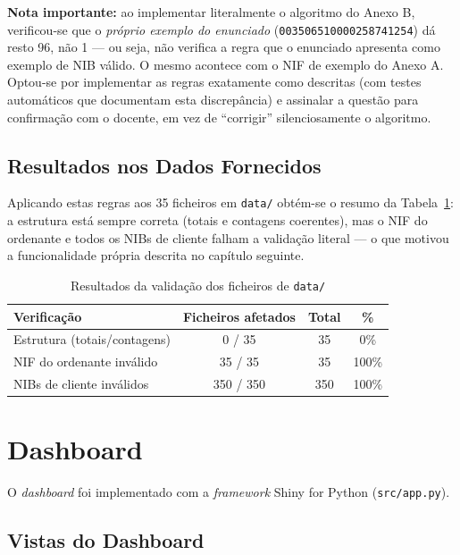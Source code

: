 \documentclass[11pt,a4paper]{report}
\begin{document}
\textbf{Nota importante:} ao implementar literalmente o algoritmo do
Anexo B, verificou-se que o \emph{próprio exemplo do enunciado}
(\texttt{003506510000258741254}) dá resto 96, não 1 --- ou seja, não
verifica a regra que o enunciado apresenta como exemplo de NIB válido. O
mesmo acontece com o NIF de exemplo do Anexo A. Optou-se por implementar as
regras exatamente como descritas (com testes automáticos que documentam
esta discrepância) e assinalar a questão para confirmação com o docente, em
vez de ``corrigir'' silenciosamente o algoritmo.

\section{Resultados nos Dados Fornecidos}

Aplicando estas regras aos 35 ficheiros em \texttt{data/} obtém-se o resumo
da Tabela~\ref{tab:validacao}: a estrutura está sempre correta (totais e
contagens coerentes), mas o NIF do ordenante e todos os NIBs de cliente
falham a validação literal --- o que motivou a funcionalidade própria
descrita no capítulo seguinte.

\begin{table}[H]\centering
  \begin{tabular}{lccc}
    \textbf{Verificação} & \textbf{Ficheiros afetados} & \textbf{Total} & \textbf{\%} \\ \hline
    Estrutura (totais/contagens) & 0 / 35  & 35 & 0\%   \\
    NIF do ordenante inválido    & 35 / 35 & 35 & 100\% \\
    NIBs de cliente inválidos    & 350 / 350 & 350 & 100\% \\
  \end{tabular}
  \caption{Resultados da validação dos ficheiros de \texttt{data/}}\label{tab:validacao}
\end{table}

\chapter{Dashboard}
\label{chap:dashboard}

O \textit{dashboard} foi implementado com a \textit{framework}
Shiny for Python\cite{shiny} (\texttt{src/app.py}).

\section{Vistas do Dashboard}
\end{document}
